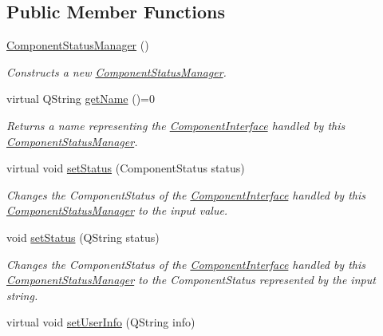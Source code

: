 \subsection*{Public Member Functions}
\begin{DoxyCompactItemize}
\item 
\hyperlink{class_component_status_manager_abd347b6732e0c3e4f675de68b5a59f69}{Component\-Status\-Manager} ()
\begin{DoxyCompactList}\small\item\em Constructs a new \hyperlink{class_component_status_manager}{Component\-Status\-Manager}. \end{DoxyCompactList}\item 
\hypertarget{class_component_status_manager_aefec86dd12b8a9ad1ca55a04391203ca}{virtual Q\-String \hyperlink{class_component_status_manager_aefec86dd12b8a9ad1ca55a04391203ca}{get\-Name} ()=0}\label{class_component_status_manager_aefec86dd12b8a9ad1ca55a04391203ca}

\begin{DoxyCompactList}\small\item\em Returns a name representing the \hyperlink{class_component_interface}{Component\-Interface} handled by this \hyperlink{class_component_status_manager}{Component\-Status\-Manager}. \end{DoxyCompactList}\item 
\hypertarget{class_component_status_manager_a6b4219dc5a4105bd24b62d89861ee443}{virtual void \hyperlink{class_component_status_manager_a6b4219dc5a4105bd24b62d89861ee443}{set\-Status} (Component\-Status status)}\label{class_component_status_manager_a6b4219dc5a4105bd24b62d89861ee443}

\begin{DoxyCompactList}\small\item\em Changes the Component\-Status of the \hyperlink{class_component_interface}{Component\-Interface} handled by this \hyperlink{class_component_status_manager}{Component\-Status\-Manager} to the input value. \end{DoxyCompactList}\item 
void \hyperlink{class_component_status_manager_a64b7210feeec90b5f7c8494449f60da3}{set\-Status} (Q\-String status)
\begin{DoxyCompactList}\small\item\em Changes the Component\-Status of the \hyperlink{class_component_interface}{Component\-Interface} handled by this \hyperlink{class_component_status_manager}{Component\-Status\-Manager} to the Component\-Status represented by the input string. \end{DoxyCompactList}\item 
\hypertarget{class_component_status_manager_a3621411701b009a63a676d5016aecfad}{virtual void \hyperlink{class_component_status_manager_a3621411701b009a63a676d5016aecfad}{set\-User\-Info} (Q\-String info)}\label{class_component_status_manager_a3621411701b009a63a676d5016aecfad}


\end{DoxyCompactItemize}
